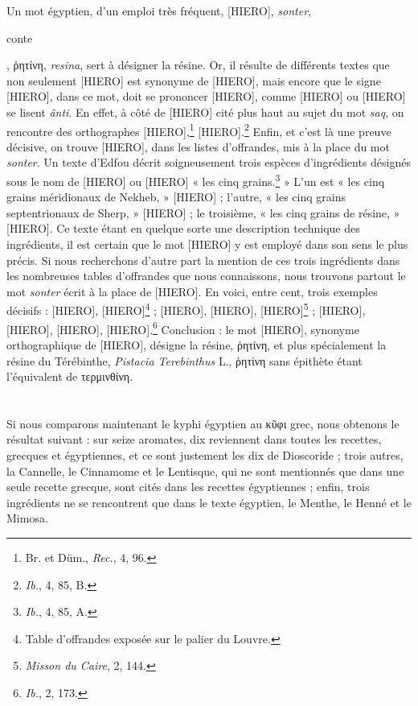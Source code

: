 \documentclass[a4paper, 11pt, oneside]{article}
\begin{document}
Un mot égyptien, d'un emploi très fréquent, [HIERO], \emph{sonter}, \begin{coptic}conte\end{coptic}, ῥητίνη, \emph{resina}, sert à désigner la résine. Or, il résulte de différents textes que non seulement [HIERO] est synonyme de [HIERO], mais encore que le signe [HIERO], dans ce mot, doit se prononcer [HIERO], comme [HIERO] ou [HIERO] se lisent \emph{ânti}. En effet, à côté de [HIERO] cité plus haut au sujet du mot \emph{saq}, on rencontre des orthographes [HIERO],\footnote{Br. et Düm., \emph{Rec.}, 4, 96.} [HIERO].\footnote{\emph{Ib.}, 4, 85, B.} Enfin, et c'est là une preuve décisive, on trouve [HIERO], dans les listes d'offrandes, mis à la place du mot \emph{sonter}. Un texte d'Edfou décrit soigneusement trois espèces d'ingrédients désignés sous le nom de [HIERO] ou [HIERO] « les cinq grains.\footnote{\emph{Ib.}, 4, 85, A.} » L'un est « les cinq grains méridionaux de Nekheb, » [HIERO] ; l'autre, « les cinq grains septentrionaux de Sherp, » [HIERO] ; le troisième, « les cinq grains de résine, » [HIERO]. Ce texte étant en quelque sorte une description technique des ingrédients, il est certain que le mot [HIERO] y est employé dans son sens le plus précis. Si nous recherchons d'autre part la mention de ces trois ingrédients dans les nombreuses tables d'offrandes que nous connaissons, nous trouvons partout le mot \emph{sonter} écrit à la place de [HIERO]. En voici, entre cent, trois exemples décisifs : [HIERO], [HIERO]\footnote{Table d'offrandes exposée sur le palier du Louvre.} ; [HIERO], [HIERO], [HIERO]\footnote{\emph{Misson du Caire}, 2, 144.} ; [HIERO], [HIERO], [HIERO], [HIERO].\footnote{\emph{Ib.}, 2, 173.} Conclusion : le mot [HIERO], synonyme orthographique de [HIERO], désigne la résine, ῥητίνη, et plus spécialement la résine du Térébinthe, \emph{Pistacia Terebinthus} L., ῥητίνη sans épithète étant l'équivalent de τερμινθίνη.
\clearpage
\section{}
\paragraph{}
Si nous comparons maintenant le kyphi égyptien au κῦφι grec, nous obtenons le résultat suivant : sur seize aromates, dix reviennent dans toutes les recettes, grecques et égyptiennes, et ce sont justement les dix de Dioscoride ; trois autres, la Cannelle, le Cinnamome et le Lentisque, qui ne sont mentionnés que dans une seule recette grecque, sont cités dans les recettes égyptiennes ; enfin, trois ingrédients ne se rencontrent que dans le texte égyptien, le Menthe, le Henné et le Mimosa.
\end{document}
